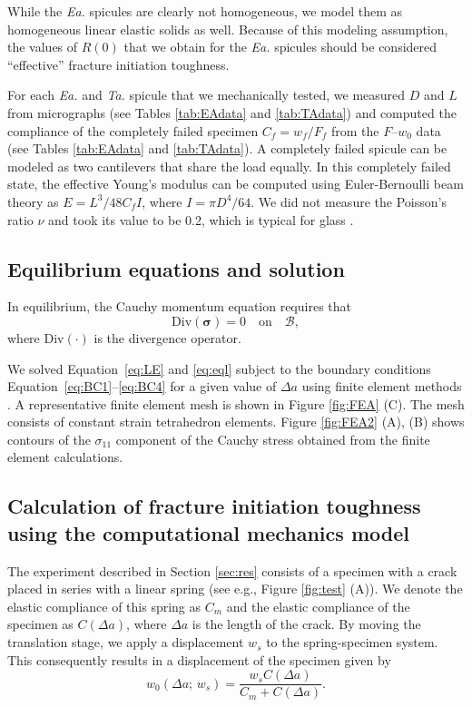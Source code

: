 \documentclass[12pt,onecolumn]{article}
\makeatletter
\newcommand{\TA}{\textit{Ta.\@}\xspace}
\newcommand{\EA}{\textit{Ea.\@}\xspace}
\makeatother
\begin{document}
\begin{bibunit}
While the \EA spicules are clearly not homogeneous, we model them as homogeneous linear elastic solids as well. Because of this modeling assumption, the values of $R(0)$ that we obtain for the \EA spicules should be considered ``effective'' fracture initiation toughness.

For each \EA and \TA spicule that we mechanically tested, we measured $D$ and $L$ from micrographs (see Tables \ref{tab:EAdata} and \ref{tab:TAdata}) and computed the compliance of the completely failed specimen $C_f=w_f/F_f$ from the $F$--$w_0$ data (see Tables \ref{tab:EAdata} and \ref{tab:TAdata}). A completely failed spicule can be modeled as two cantilevers that share the load equally. In this completely failed state, the effective Young's modulus can be computed using Euler-Bernoulli beam theory as $E=L^3/48C_f I$, where $I=\pi D^4/64$.  We did not measure the Poisson's ratio $\nu$ and took its value to be 0.2, which is typical for glass \cite{davidge1968effective}.

\subsection{Equilibrium equations and solution}
In equilibrium, the Cauchy momentum equation requires that 
%
\begin{equation}
\label{eq:eql}
    \mathrm{Div}(\bm{\sigma}) = 0 \quad \text{on} \quad \mathcal{B},
\end{equation}
%
where $\mathrm{Div}(\cdot)$ is the divergence operator.

We solved Equation~\eqref{eq:LE} and \eqref{eq:eql} subject to the boundary conditions Equation~\eqref{eq:BC1}--\eqref{eq:BC4} for a given value of $\Delta a$ using finite element methods \cite{hughes2012finite}. A representative finite element mesh is shown in Figure \ref{fig:FEA} (C). The mesh consists of constant strain tetrahedron elements. Figure \ref{fig:FEA2} (A), (B) shows contours of the $\sigma_{11}$ component of the Cauchy stress obtained from the finite element calculations.

\subsection{Calculation of fracture initiation toughness using the computational mechanics model}
The experiment described in Section \ref{sec:res} consists of a specimen with a crack placed in series with a linear spring (see e.g., Figure \ref{fig:test} (A)). We denote the elastic compliance of this spring as $C_m$ and the elastic compliance of the specimen as $C(\Delta a)$, where $\Delta a$ is the length of the crack.
%
By moving the translation stage, we apply a displacement $w_{s}$ to the spring-specimen system. This consequently results in a displacement of the specimen given by
%
\begin{equation}
\label{eq:wc}
    w_0(\Delta a;\,w_s)=\frac{w_s C(\Delta a)}{C_m+C(\Delta a)}.
\end{equation}
%


\end{bibunit}
\end{document}
